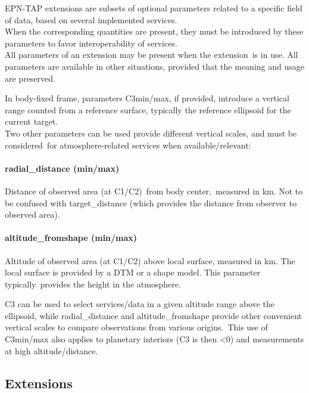 \documentclass[11pt,a4paper]{ivoa}
\begin{document}
EPN-TAP extensions are subsets of optional parameters related to a specific field of data, based on several implemented services.\\When the corresponding quantities are present, they must be introduced by these parameters to favor interoperability of services.\\All parameters of an extension may be present when the extension is in use. All parameters are available in other situations, provided that the meaning and usage are preserved. 

In body-fixed frame, parameters C3min/max, if provided, introduce a vertical range counted from a reference surface, typically the reference ellipsoid for the current target. \\

Two other parameters can be used provide different vertical scales, and must be considered for atmosphere-related services when available/relevant: \\

\paragraph{radial\_distance (min/max)}

Distance of observed area (at C1/C2) from body center, measured in km. Not to be confused with target\_distance (which provides the distance from observer to observed area). 

\paragraph{altitude\_fromshape (min/max)}

Altitude of observed area (at C1/C2) above local surface, measured in km. The local surface is provided by a DTM or a shape model. This parameter typically provides the height in the atmosphere.

C3 can be used to select services/data in a given altitude range above the ellipsoid, while radial\_distance and altitude\_fromshape provide other convenient vertical scales to compare observations from various origins. This use of C3min/max also applies to planetary interiors (C3 is then <0) and measurements at high altitude/distance. 

\subsection{Extensions}
\end{document}

